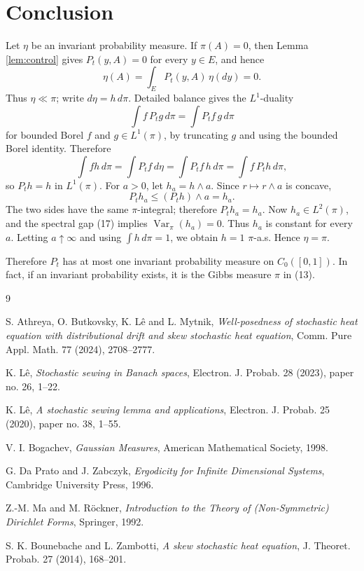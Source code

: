 \documentclass[12pt]{article}
\newcommand{\1}{\mathbf 1}
\newcommand{\Var}{\operatorname{Var}}
\begin{document}
\section*{Conclusion}

Let \(\eta\) be an invariant probability measure.  If \(\pi(A)=0\), then
Lemma \ref{lem:control} gives \(P_t(y,A)=0\) for every \(y\in E\), and hence
\[
        \eta(A)=\int_E P_t(y,A)\,\eta(dy)=0.
\]
Thus \(\eta\ll\pi\); write \(d\eta=h\,d\pi\).  Detailed balance gives the
\(L^1\)-duality
\[
        \int f\,P_t g\,d\pi=\int P_t f\,g\,d\pi
\]
for bounded Borel \(f\) and \(g\in L^1(\pi)\), by truncating \(g\) and using
the bounded Borel identity.  Therefore
\[
 \int f h\,d\pi=\int P_tf\,d\eta
      =\int P_tf\,h\,d\pi=\int f\,P_t h\,d\pi ,
\]
so \(P_t h=h\) in \(L^1(\pi)\).  For \(a>0\), let \(h_a=h\wedge a\).  Since
\(r\mapsto r\wedge a\) is concave,
\[
        P_t h_a\le (P_t h)\wedge a=h_a .
\]
The two sides have the same \(\pi\)-integral; therefore \(P_t h_a=h_a\).
Now \(h_a\in L^2(\pi)\), and the spectral gap (17) implies
\(\Var_\pi(h_a)=0\).  Thus \(h_a\) is constant for every \(a\).  Letting
\(a\uparrow\infty\) and using \(\int h\,d\pi=1\), we obtain \(h=1\)
\(\pi\)-a.s.  Hence \(\eta=\pi\).

Therefore \(P_t\) has at most one invariant probability measure on
\(C_0([0,1])\).  In fact, if an invariant probability exists, it is the Gibbs
measure \(\pi\) in (13).

\begin{thebibliography}{9}

S. Athreya, O. Butkovsky, K. L\^e and L. Mytnik,
\emph{Well-posedness of stochastic heat equation with distributional drift
and skew stochastic heat equation}, Comm. Pure Appl. Math. 77 (2024),
2708--2777.

K. L\^e,
\emph{Stochastic sewing in Banach spaces}, Electron. J. Probab. 28 (2023),
paper no. 26, 1--22.

K. L\^e,
\emph{A stochastic sewing lemma and applications}, Electron. J. Probab. 25
(2020), paper no. 38, 1--55.

V. I. Bogachev,
\emph{Gaussian Measures}, American Mathematical Society, 1998.

G. Da Prato and J. Zabczyk,
\emph{Ergodicity for Infinite Dimensional Systems}, Cambridge University
Press, 1996.

Z.-M. Ma and M. R\"ockner,
\emph{Introduction to the Theory of (Non-Symmetric) Dirichlet Forms},
Springer, 1992.

S. K. Bounebache and L. Zambotti,
\emph{A skew stochastic heat equation}, J. Theoret. Probab. 27 (2014),
168--201.

\end{thebibliography}
\end{document}
